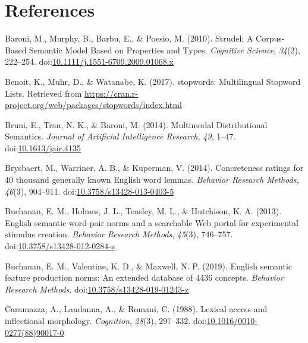 \documentclass[man]{apa6}
\begin{document}
\newpage

\hypertarget{references}{%
\section{References}\label{references}}

\begingroup
\setlength{\parindent}{-0.5in}
\setlength{\leftskip}{0.5in}

\hypertarget{refs}{}
\leavevmode\hypertarget{ref-Baroni2010}{}%
Baroni, M., Murphy, B., Barbu, E., \& Poesio, M. (2010). Strudel: A Corpus-Based Semantic Model Based on Properties and Types. \emph{Cognitive Science}, \emph{34}(2), 222--254. doi:\href{https://doi.org/10.1111/j.1551-6709.2009.01068.x}{10.1111/j.1551-6709.2009.01068.x}

\leavevmode\hypertarget{ref-Benoit2017}{}%
Benoit, K., Muhr, D., \& Watanabe, K. (2017). stopwords: Multilingual Stopword Lists. Retrieved from \url{https://cran.r-project.org/web/packages/stopwords/index.html}

\leavevmode\hypertarget{ref-Bruni2014}{}%
Bruni, E., Tran, N. K., \& Baroni, M. (2014). Multimodal Distributional Semantics. \emph{Journal of Artificial Intelligence Research}, \emph{49}, 1--47. doi:\href{https://doi.org/10.1613/jair.4135}{10.1613/jair.4135}

\leavevmode\hypertarget{ref-Brysbaert2014}{}%
Brysbaert, M., Warriner, A. B., \& Kuperman, V. (2014). Concreteness ratings for 40 thousand generally known English word lemmas. \emph{Behavior Research Methods}, \emph{46}(3), 904--911. doi:\href{https://doi.org/10.3758/s13428-013-0403-5}{10.3758/s13428-013-0403-5}

\leavevmode\hypertarget{ref-Buchanan2013}{}%
Buchanan, E. M., Holmes, J. L., Teasley, M. L., \& Hutchison, K. A. (2013). English semantic word-pair norms and a searchable Web portal for experimental stimulus creation. \emph{Behavior Research Methods}, \emph{45}(3), 746--757. doi:\href{https://doi.org/10.3758/s13428-012-0284-z}{10.3758/s13428-012-0284-z}

\leavevmode\hypertarget{ref-Buchanan2019}{}%
Buchanan, E. M., Valentine, K. D., \& Maxwell, N. P. (2019). English semantic feature production norms: An extended database of 4436 concepts. \emph{Behavior Research Methods}. doi:\href{https://doi.org/10.3758/s13428-019-01243-z}{10.3758/s13428-019-01243-z}

\leavevmode\hypertarget{ref-Caramazza1988}{}%
Caramazza, A., Laudanna, A., \& Romani, C. (1988). Lexical access and inflectional morphology. \emph{Cognition}, \emph{28}(3), 297--332. doi:\href{https://doi.org/10.1016/0010-0277(88)90017-0}{10.1016/0010-0277(88)90017-0}
\end{document}
